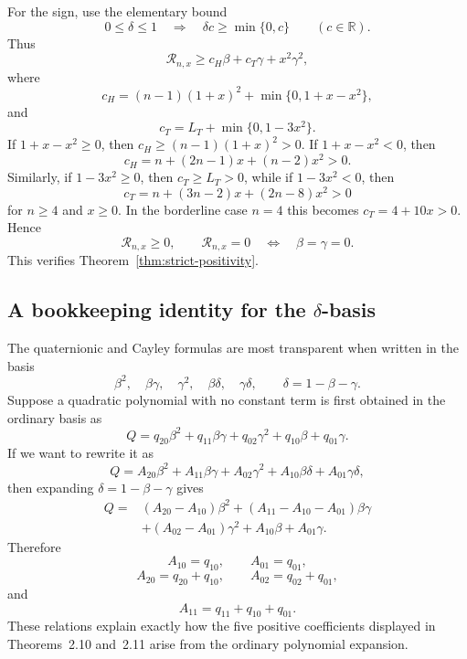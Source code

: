\documentclass[11pt,reqno]{amsart}
\numberwithin{equation}{section}
\theoremstyle{definition}
\theoremstyle{remark}
\begin{document}
For the sign, use the elementary bound
\[
0\le\delta\le1
\quad\Longrightarrow\quad
\delta c\ge\min\{0,c\}
\qquad(c\in\mathbb R).
\]
Thus
\[
\mathcal R_{n,x}
\ge c_H\beta+c_T\gamma+x^2\gamma^2,
\]
where
\[
c_H=(n-1)(1+x)^2+\min\{0,1+x-x^2\},
\]
and
\[
c_T=L_T+\min\{0,1-3x^2\}.
\]
If $1+x-x^2\ge0$, then $c_H\ge(n-1)(1+x)^2>0$.  If
$1+x-x^2<0$, then
\[
c_H=n+(2n-1)x+(n-2)x^2>0.
\]
Similarly, if $1-3x^2\ge0$, then $c_T\ge L_T>0$, while if
$1-3x^2<0$, then
\[
c_T=n+(3n-2)x+(2n-8)x^2>0
\]
for $n\ge4$ and $x\ge0$.  In the borderline case $n=4$ this becomes
$c_T=4+10x>0$.  Hence
\[
\mathcal R_{n,x}\ge0,
\qquad
\mathcal R_{n,x}=0
\quad\Longleftrightarrow\quad
\beta=\gamma=0.
\]
This verifies Theorem~\ref{thm:strict-positivity}.

\subsection{A bookkeeping identity for the $\delta$-basis}

The quaternionic and Cayley formulas are most transparent when written in the
basis
\[
\beta^2,\quad\beta\gamma,\quad\gamma^2,
\quad\beta\delta,\quad\gamma\delta,
\qquad
\delta=1-\beta-\gamma.
\]
Suppose a quadratic polynomial with no constant term is first obtained in the
ordinary basis as
\begin{equation}
Q=q_{20}\beta^2+q_{11}\beta\gamma+q_{02}\gamma^2
+q_{10}\beta+q_{01}\gamma.
\label{eq:appx-raw-basis}
\end{equation}
If we want to rewrite it as
\begin{equation}
Q=A_{20}\beta^2+A_{11}\beta\gamma+A_{02}\gamma^2
+A_{10}\beta\delta+A_{01}\gamma\delta,
\label{eq:appx-delta-basis}
\end{equation}
then expanding $\delta=1-\beta-\gamma$ gives
\begin{align*}
Q
={}&(A_{20}-A_{10})\beta^2
+(A_{11}-A_{10}-A_{01})\beta\gamma\\
&+(A_{02}-A_{01})\gamma^2
+A_{10}\beta+A_{01}\gamma.
\end{align*}
Therefore
\begin{equation}
A_{10}=q_{10},\qquad A_{01}=q_{01},
\label{eq:appx-delta-basis-linear}
\end{equation}
\begin{equation}
A_{20}=q_{20}+q_{10},\qquad
A_{02}=q_{02}+q_{01},
\label{eq:appx-delta-basis-diagonal}
\end{equation}
and
\begin{equation}
A_{11}=q_{11}+q_{10}+q_{01}.
\label{eq:appx-delta-basis-mixed}
\end{equation}
These relations explain exactly how the five positive coefficients displayed
in Theorems~2.10 and~2.11 arise from the ordinary polynomial expansion.
\end{document}
